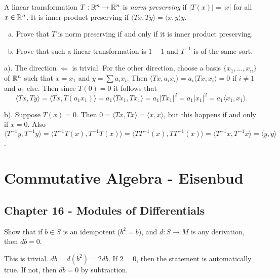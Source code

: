 \documentclass[11pt, english]{article}
\begin{document}
\begin{exc}[Exercise 1.7]
A linear transformation $T:\mathbb{R}^n \to \mathbb{R}^n$ is \emph{norm preserving} if $\lvert T(x)\rvert = \lvert x \rvert$ for all $x \in \mathbb{R}^n$. It is inner product preserving if $\langle Tx,Ty \rangle = \langle x,y \rangle y$. 
\begin{enumerate}[a)]
\item Prove that $T$ is norm preserving if and only if it is inner product preserving.
\item Prove that such a linear transformation is $1-1$ and $T^{-1}$ is of the same sort.
\end{enumerate}
\end{exc}
\begin{sol}
a). The direction $\Leftarrow$ is trivial. For the other direction, choose a basis $\{x_1,\ldots,x_n\}$ of $\mathbb{R}^n$ such that $x=x_1$ and $y=\sum a_ix_i$. 
Then $\langle Tx ,a_ix_i \rangle = a_i \langle T x, x_i \rangle = 0$ if $i \neq 1$ and $a_1$ else. Then since $T(0)=0$ it follows that 
\[
\langle Tx, Ty \rangle = \langle Tx,T(a_1x_1) \rangle = a_1 \langle Tx_1,Tx_1 \rangle = a_1 \lvert Tx_1\rvert ^2 = a_1 \lvert x_1 \rvert ^2 = a_1\langle x_1,x_1 \rangle.
\]

b). Suppose $T(x)=0$. Then $0=\langle Tx,Tx \rangle = \langle x,x \rangle$, but this happens if and only if $x=0$. Also $\langle T^{-1} y,T^{-1}y \rangle = \langle T^{-1}T(x),T^{-1}T(x) \rangle = \langle TT^{-1}(x),TT^{-1}(x) \rangle = \langle T^{-1}x,T^{-1}x \rangle = \langle y,y \rangle$. 
\end{sol}

\section{Commutative Algebra - Eisenbud}

\subsection{Chapter 16 - Modules of Differentials}
\begin{exc}[Exercise 16.1]
Show that if $b \in S$ is an idempotent ($b^2=b$), and $d:S \to M$ is any derivation, then $db=0$.  
\end{exc}
\begin{sol}
This is trivial. $db=d(b^2)=2db$. If $2=0$, then the statement is automatically true. If not, then $db=0$ by subtraction. 
\end{sol}
\end{document}
